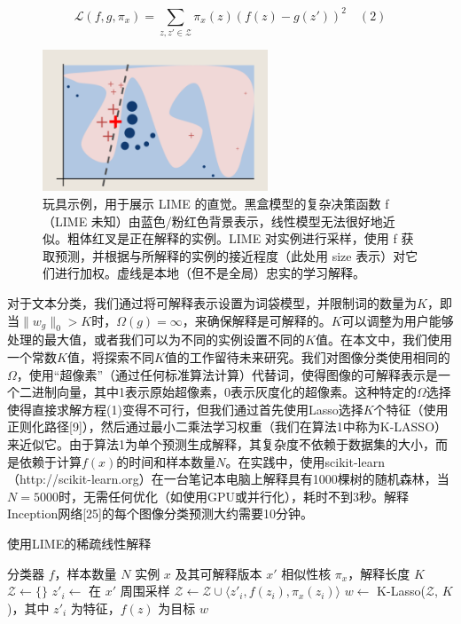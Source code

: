 \documentclass[12pt, a4paper]{ctexart} %
\begin{document}
\[\mathcal{L}(f, g, \pi_x) = \sum_{z, z' \in \mathcal{Z}} \pi_x(z) \left( f(z) - g(z') \right)^2 \quad (2)\]

\begin{figure}[h]
    \centering
    \includegraphics[width=0.6\textwidth]{img/img_3.png}
    \caption{玩具示例，用于展示 LIME 的直觉。黑盒模型的复杂决策函数 f（LIME 未知）由蓝色/粉红色背景表示，线性模型无法很好地近似。粗体红叉是正在解释的实例。LIME 对实例进行采样，使用 f 获取预测，并根据与所解释的实例的接近程度（此处用 size 表示）对它们进行加权。虚线是本地（但不是全局）忠实的学习解释。}
    \label{fig:img_3}
\end{figure}

对于文本分类，我们通过将可解释表示设置为词袋模型，并限制词的数量为\(K\)，即当\(\|w_g\|_0 > K\)时，\(\Omega(g) = \infty\)，来确保解释是可解释的。\(K\)可以调整为用户能够处理的最大值，或者我们可以为不同的实例设置不同的\(K\)值。在本文中，我们使用一个常数\(K\)值，将探索不同\(K\)值的工作留待未来研究。我们对图像分类使用相同的\(\Omega\)，使用“超像素”（通过任何标准算法计算）代替词，使得图像的可解释表示是一个二进制向量，其中1表示原始超像素，0表示灰度化的超像素。这种特定的\(\Omega\)选择使得直接求解方程(1)变得不可行，但我们通过首先使用Lasso选择\(K\)个特征（使用正则化路径[9]），然后通过最小二乘法学习权重（我们在算法1中称为K-LASSO）来近似它。由于算法1为单个预测生成解释，其复杂度不依赖于数据集的大小，而是依赖于计算\(f(x)\)的时间和样本数量\(N\)。在实践中，使用scikit-learn（http://scikit-learn.org）在一台笔记本电脑上解释具有1000棵树的随机森林，当\(N=5000\)时，无需任何优化（如使用GPU或并行化），耗时不到3秒。解释Inception网络[25]的每个图像分类预测大约需要10分钟。

\begin{algorithm}
    \caption{使用LIME的稀疏线性解释}
    \begin{algorithmic}[1]
    \REQUIRE 分类器 \(f\)，样本数量 \(N\)
    \REQUIRE 实例 \(x\) 及其可解释版本 \(x'\)
    \REQUIRE 相似性核 \(\pi_x\)，解释长度 \(K\)
    \STATE \(\mathcal{Z} \leftarrow \{\}\)
        \STATE \(z'_i \leftarrow\) 在 \(x'\) 周围采样
        \STATE\(\mathcal{Z} \leftarrow \mathcal{Z} \cup \langle z'_i, f(z_i), \pi_x(z_i) \rangle\)
    \ENDFOR
    \STATE \(w \leftarrow\) K-Lasso(\(\mathcal{Z}\), \(K\))，其中 \(z'_i\) 为特征，\(f(z)\) 为目标
    \RETURN \(w\)
    \end{algorithmic}
\end{algorithm}
    
\end{document}
